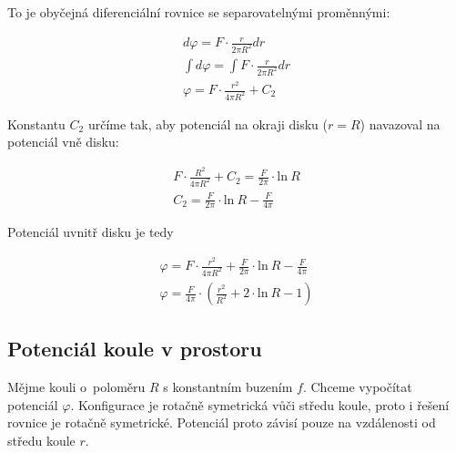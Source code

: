 \documentclass{book}
\begin{document}
To je obyčejná diferenciální rovnice se separovatelnými proměnnými:

\begin{equation}
\label{eq:potencial_disku_uvnitr}
\begin{split}
d \varphi = F \cdot \frac{r}{2 \pi R^2} dr \\
\int d \varphi = \int F \cdot \frac{r}{2 \pi R^2} dr \\
\varphi = F \cdot \frac{r^2}{4 \pi R^2} + C_2
\end{split}
\end{equation}

Konstantu \(C_2\) určíme tak, aby potenciál na okraji disku (\(r = R\)) navazoval na potenciál vně disku:

\begin{equation}
\begin{split}
F \cdot \frac{R^2}{4 \pi R^2} + C_2 = \frac{F}{2 \pi} \cdot \mathrm{ln} \ R \\
C_2 = \frac{F}{2 \pi} \cdot \mathrm{ln} \ R - \frac{F}{4 \pi}
\end{split}
\end{equation}

Potenciál uvnitř disku je tedy

\begin{equation}
\begin{split}
\varphi = F \cdot \frac{r^2}{4 \pi R^2} + \frac{F}{2 \pi} \cdot \mathrm{ln} \ R - \frac{F}{4 \pi} \\
\varphi = \frac{F}{4 \pi} \cdot \left (\frac{r^2}{R^2} + 2 \cdot \mathrm{ln} \ R - 1 \right)
\end{split}
\end{equation}


\subsection{Potenciál koule v prostoru}

Mějme kouli o~poloměru \(R\) s konstantním buzením \(f\). Chceme vypočítat potenciál \(\varphi\). Konfigurace je rotačně symetrická vůči středu
koule, proto i řešení rovnice je rotačně symetrické. Potenciál proto závisí pouze na vzdálenosti od středu koule \(r\).


\end{document}
